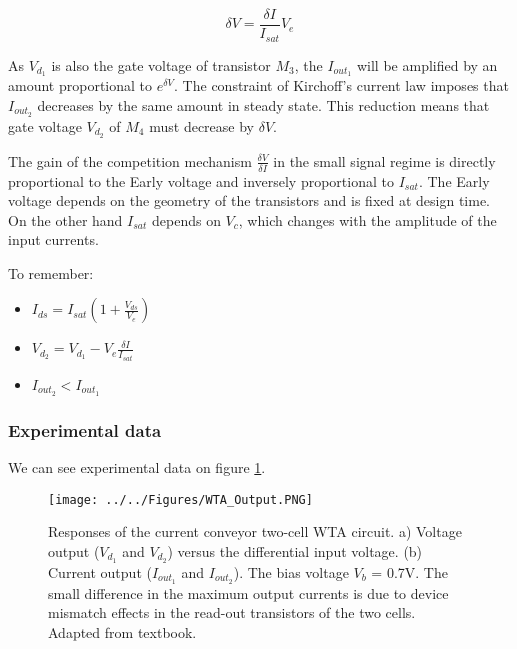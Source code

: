 \begin{equation}
    \delta V = \frac{\delta I}{I_{sat}}V_e
\end{equation}

As $V_{d_1}$ is also the gate voltage of transistor $M_3$, the $I_{out_1}$ will be amplified by an amount proportional to $e^{\delta V}$. The constraint of Kirchoff's current law imposes that $I_{out_2}$ decreases by the same amount in steady state. This reduction means that gate voltage $V_{d_2}$ of $M_4$ must decrease by $\delta V$. 

The gain of the competition mechanism $\frac{\delta V}{\delta I}$ in the small signal regime is directly proportional to the Early voltage and inversely proportional to $I_{sat}$. The Early voltage depends on the geometry of the transistors and is fixed at design time. On the other hand $I_{sat}$ depends on $V_c$, which changes with the amplitude of the input currents. 

To remember: 

\begin{itemize}
    \item $I_{ds} = I_{sat}(1 + \frac{V_{ds}}{V_e})$
    \item $V_{d_2} = V_{d_1} - V_e \frac{\delta I}{I_{sat}}$
    \item $I_{out_2} < I_{out_1}$
\end{itemize}

\subsubsection{Experimental data}

We can see experimental data on figure \ref{fig:WTA_Output}. 

\begin{figure}[H]
    \centering
    \texttt{[image: ../../Figures/WTA\_Output.PNG]}
    \caption{Responses of the current conveyor two-cell WTA circuit. a) Voltage output ($V_{d_1}$ and $V_{d_2}$) versus the differential input voltage. (b) Current output ($I_{out_1}$ and $I_{out_2}$). The bias voltage $V_b$ = 0.7V. The small difference in the maximum output currents is due to device mismatch effects in the read-out transistors of the two cells. Adapted from textbook.}
    \label{fig:WTA_Output}
\end{figure}

